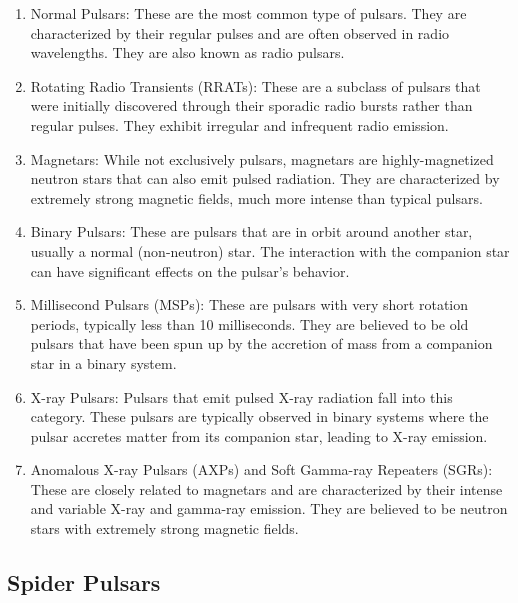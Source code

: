 \begin{enumerate}
    \item Normal Pulsars: These are the most common type of pulsars. They are characterized by their regular pulses and are often observed in radio wavelengths. They are also known as radio pulsars. %

    \item Rotating Radio Transients (RRATs): These are a subclass of pulsars that were initially discovered through their sporadic radio bursts rather than regular pulses. They exhibit irregular and infrequent radio emission.

    \item Magnetars: While not exclusively pulsars, magnetars are highly-magnetized neutron stars that can also emit pulsed radiation. They are characterized by extremely strong magnetic fields, much more intense than typical pulsars.

    \item Binary Pulsars: These are pulsars that are in orbit around another star, usually a normal (non-neutron) star. The interaction with the companion star can have significant effects on the pulsar's behavior.
    
    \item Millisecond Pulsars (MSPs): These are pulsars with very short rotation periods, typically less than 10 milliseconds. They are believed to be old pulsars that have been spun up by the accretion of mass from a companion star in a binary system.

    \item X-ray Pulsars: Pulsars that emit pulsed X-ray radiation fall into this category. These pulsars are typically observed in binary systems where the pulsar accretes matter from its companion star, leading to X-ray emission.

    \item Anomalous X-ray Pulsars (AXPs) and Soft Gamma-ray Repeaters (SGRs): These are closely related to magnetars and are characterized by their intense and variable X-ray and gamma-ray emission. They are believed to be neutron stars with extremely strong magnetic fields.
\end{enumerate}

\subsection{Spider Pulsars}

